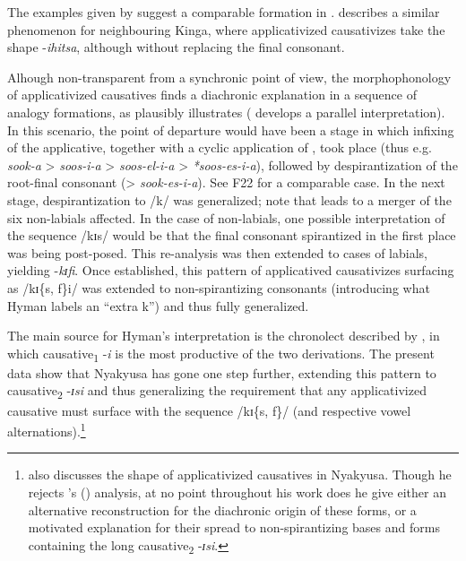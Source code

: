 The examples given by \citet[76]{BotneR2008} suggest a comparable formation in . \citet[63]{WolffR1905} describes a similar phenomenon for neighbouring Kinga, where applicativized causativizes take the shape -\textit{ihitsa}, although without replacing the final consonant.

Alhough non-transparent from a synchronic point of view, the morphophonology of applicativized causatives finds a diachronic explanation in a sequence of analogy formations, as \citet{HymanL2003b} plausibly illustrates (\citealt[266f]{BergerP1938} develops a parallel interpretation). In this scenario, the point of departure would have been a stage in which infixing of the applicative, together with a cyclic application of , took place (thus e.g. \textit{sook-a} > \textit{soos-i-a} > \textit{soos-el-i-a} > \textit{*soos-es-i-a}), followed by despirantization of the root-final consonant (> \textit{sook-es-i-a}). See  F22 \citep[20--22]{SchadebergTMagangaC1992} for a comparable case. In the next stage, despirantization to /k/ was generalized; note that  leads to a merger of the six non-labials affected. In the case of non-labials, one possible interpretation of the sequence /kɪs/ would be that the final consonant spirantized in the first place was being post-posed. This re-analysis was then extended to cases of labials, yielding -\textit{kɪfi}. Once established, this pattern of applicatived causativizes surfacing as /kɪ\{s, f\}i/ was extended to non-spirantizing consonants (introducing what Hyman labels an ``extra k'') and thus fully generalized.

The main source for Hyman's interpretation is the chronolect described by \citet{SchumannK1899}, in which causative\textsubscript{1} -\textit{i} is the most productive of the two derivations. The present data show that Nyakyusa has gone one step further, extending this pattern to causative\textsubscript{2} -\textit{ɪsi} and thus generalizing the requirement that any applicativized causative must surface with the sequence /kɪ\{s, f\}/ (and respective vowel alternations).\footnote{\citet{LusekeloA2012} also discusses the shape of applicativized causatives in Nyakyusa. Though he rejects \citeauthor{HymanL2003b}'s (\citeyear{HymanL2003b}) analysis, at no point throughout his work does he give either an alternative reconstruction for the diachronic origin of these forms, or a motivated explanation for their spread to non-spirantizing bases and forms containing the long causative\textsubscript{2} -\textit{ɪsi}.}
